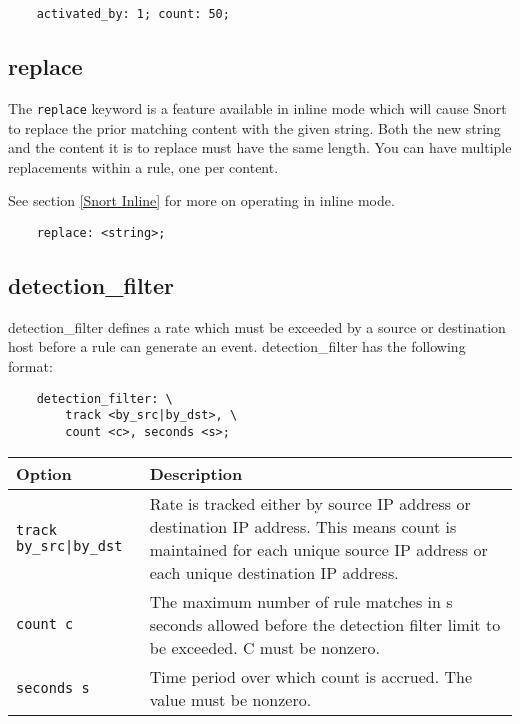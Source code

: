\documentclass[english]{report}
\begin{document}
\begin{verbatim}
    activated_by: 1; count: 50;
\end{verbatim}

\subsection{replace}
\label{replace}

The \texttt{replace} keyword is a feature available in inline mode which will
cause Snort to replace the prior matching content with the given string.  Both
the new string and the content it is to replace must have the same length.  You
can have multiple replacements within a rule, one per content.

See section \ref{Snort Inline} for more on operating in inline mode.

\begin{verbatim}
    replace: <string>;
\end{verbatim}

\subsection{detection\_filter}
\label{detection_filter}

detection\_filter defines a rate which must be exceeded by a source or
destination host before a rule can generate an event.  detection\_filter has
the following format:

\begin{verbatim}
    detection_filter: \
        track <by_src|by_dst>, \
        count <c>, seconds <s>;
\end{verbatim}

\begin{table}[h]
\begin{center}
\begin{tabular}{| p{1in} | p{4.5in} |}

\hline
Option & Description \\
\hline

\hline
\texttt{track by\_src|by\_dst} &

Rate is tracked either by source IP address or destination IP address.  This
means count is maintained for each unique source IP address or each unique
destination IP address.\\

\hline
\texttt{count c} &

The maximum number of rule matches in s seconds allowed before the detection
filter limit to be exceeded.  C must be nonzero.\\

\hline
\texttt{seconds s} &

Time period over which count is accrued.  The value must be nonzero.\\

\hline
\end{tabular}
\end{center}
\end{table}
\end{document}
